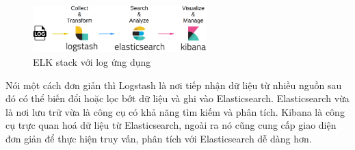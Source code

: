 \begin{figure}[H] %
    \centering %
    \includegraphics[width=0.6\textwidth]{figures/elk_01.png} 
    \caption{ELK stack với log ứng dụng} %
    \label{fig:elk_01}
\end{figure}
Nói một cách đơn giản thì Logstash là nơi tiếp nhận dữ liệu từ nhiều nguồn sau đó có thể biến đổi hoặc lọc bớt dữ liệu và ghi vào Elasticsearch. Elasticsearch vừa là nơi lưu trữ vừa là công cụ có khả năng tìm kiếm và phân tích. Kibana là công cụ trực quan hoá dữ liệu từ Elasticsearch, ngoài ra nó cũng cung cấp giao diện đơn giản để thực hiện truy vấn, phân tích với Elasticsearch dễ dàng hơn.